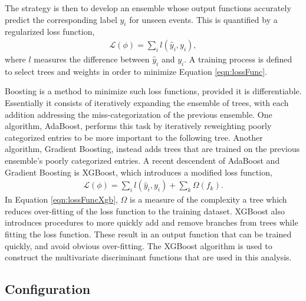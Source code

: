 The strategy is then to develop an ensemble whose output functions accurately predict the corresponding label $y_i$ for unseen events.
This is quantified by a regularized loss function,
\begin{equation}\begin{split}\label{eqn:lossFunc}
    \mathcal{L}(\phi)=\sum_i l(\hat{y}_i,y_i),
\end{split}\end{equation} 
where $l$ measures the difference between $\hat{y}_i$ and $y_i$.
A training process is defined to select trees and weights in order to minimize Equation \ref{eqn:lossFunc}.

Boosting is a method to minimize such loss functions, provided it is differentiable.
Essentially it consists of iteratively expanding the ensemble of trees, with each addition addressing the miss-categorization of the previous ensemble.
One algorithm, AdaBoost, performs this task by iteratively reweighting poorly categorized entries to be more important to the following tree.
Another algorithm, Gradient Boosting, instead adds trees that are trained on the previous ensemble's poorly categorized entries.
A recent descendent of AdaBoost and Gradient Boosting is XGBoost, which introduces a modified loss function,
\begin{equation}\begin{split}\label{eqn:lossFuncXgb}
    \mathcal{L}(\phi)=\sum_i l(\hat{y}_i,y_i)+\sum_k \Omega(f_k).
\end{split}\end{equation} 
In Equation \ref{eqn:lossFuncXgb}, $\Omega$ is a measure of the complexity a tree which reduces over-fitting of the loss function to the training dataset.
XGBoost also introduces procedures to more quickly add and remove branches from trees while fitting the loss function.
These result in an output function that can be trained quickly, and avoid obvious over-fitting.
The XGBoost algorithm is used to construct the multivariate discriminant functions that are used in this analysis.
\cite{xgboost}

\subsection{Configuration}
\label{sec:hmmBdtConfiguration}

